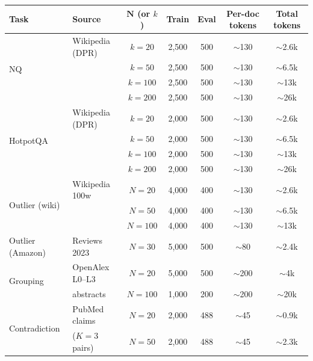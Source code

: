 \begin{table}[h]
\centering
\small
\setlength{\tabcolsep}{4pt}
\begin{tabular}{l l c c c c c}
\toprule
\textbf{Task} & \textbf{Source} & $\bm{N}$ (or $k$) & \textbf{Train} & \textbf{Eval} & \textbf{Per-doc tokens} & \textbf{Total tokens} \\
\midrule
\multirow{4}{*}{NQ}            & Wikipedia (DPR) & $k{=}20$  & 2{,}500 & 500 & $\sim$130 & $\sim$2.6k \\
                               &                 & $k{=}50$  & 2{,}500 & 500 & $\sim$130 & $\sim$6.5k \\
                               &                 & $k{=}100$ & 2{,}500 & 500 & $\sim$130 & $\sim$13k  \\
                               &                 & $k{=}200$ & 2{,}500 & 500 & $\sim$130 & $\sim$26k  \\
\midrule
\multirow{4}{*}{HotpotQA}      & Wikipedia (DPR) & $k{=}20$  & 2{,}000 & 500 & $\sim$130 & $\sim$2.6k \\
                               &                 & $k{=}50$  & 2{,}000 & 500 & $\sim$130 & $\sim$6.5k \\
                               &                 & $k{=}100$ & 2{,}000 & 500 & $\sim$130 & $\sim$13k  \\
                               &                 & $k{=}200$ & 2{,}000 & 500 & $\sim$130 & $\sim$26k  \\
\midrule
\multirow{3}{*}{Outlier (wiki)}& Wikipedia 100w  & $N{=}20$  & 4{,}000 & 400 & $\sim$130 & $\sim$2.6k \\
                               &                 & $N{=}50$  & 4{,}000 & 400 & $\sim$130 & $\sim$6.5k \\
                               &                 & $N{=}100$ & 4{,}000 & 400 & $\sim$130 & $\sim$13k  \\
\midrule
Outlier (Amazon)               & Reviews 2023    & $N{=}30$  & 5{,}000 & 500 & $\sim$80  & $\sim$2.4k \\
\midrule
\multirow{2}{*}{Grouping}      & OpenAlex L0--L3 & $N{=}20$  & 5{,}000 & 500 & $\sim$200 & $\sim$4k   \\
                               & abstracts       & $N{=}100$ & 1{,}000 & 200 & $\sim$200 & $\sim$20k  \\
\midrule
\multirow{4}{*}{Contradiction} & PubMed claims   & $N{=}20$  & 2{,}000 & 488 & $\sim$45  & $\sim$0.9k \\
                               & ($K{=}3$ pairs) & $N{=}50$  & 2{,}000 & 488 & $\sim$45  & $\sim$2.3k \\

\end{tabular}
\end{table}
